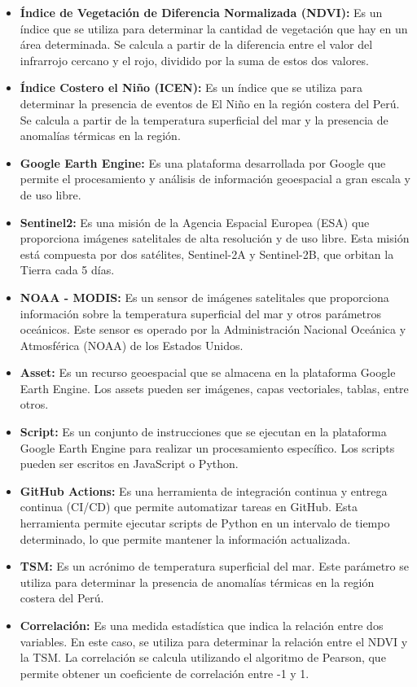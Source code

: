     \begin{itemize}
      \item \textbf{Índice de Vegetación de Diferencia Normalizada (NDVI):} Es un índice que se utiliza para determinar la cantidad de vegetación que hay en un área determinada. Se calcula a partir de la diferencia entre el valor del infrarrojo cercano y el rojo, dividido por la suma de estos dos valores.
      \item \textbf{Índice Costero el Niño (ICEN):} Es un índice que se utiliza para determinar la presencia de eventos de El Niño en la región costera del Perú. Se calcula a partir de la temperatura superficial del mar y la presencia de anomalías térmicas en la región.
      \item \textbf{Google Earth Engine:} Es una plataforma desarrollada por Google que permite el procesamiento y análisis de información geoespacial a gran escala y de uso libre.
      \item \textbf{Sentinel2:} Es una misión de la Agencia Espacial Europea (ESA) que proporciona imágenes satelitales de alta resolución y de uso libre. Esta misión está compuesta por dos satélites, Sentinel-2A y Sentinel-2B, que orbitan la Tierra cada 5 días.
      \item \textbf{NOAA - MODIS:} Es un sensor de imágenes satelitales que proporciona información sobre la temperatura superficial del mar y otros parámetros oceánicos. Este sensor es operado por la Administración Nacional Oceánica y Atmosférica (NOAA) de los Estados Unidos.
      \item \textbf{Asset:} Es un recurso geoespacial que se almacena en la plataforma Google Earth Engine. Los assets pueden ser imágenes, capas vectoriales, tablas, entre otros.
      \item \textbf{Script:} Es un conjunto de instrucciones que se ejecutan en la plataforma Google Earth Engine para realizar un procesamiento específico. Los scripts pueden ser escritos en JavaScript o Python.
      \item \textbf{GitHub Actions:} Es una herramienta de integración continua y entrega continua (CI/CD) que permite automatizar tareas en GitHub. Esta herramienta permite ejecutar scripts de Python en un intervalo de tiempo determinado, lo que permite mantener la información actualizada.
      \item \textbf{TSM:} Es un acrónimo de temperatura superficial del mar. Este parámetro se utiliza para determinar la presencia de anomalías térmicas en la región costera del Perú.
      \item \textbf{Correlación:} Es una medida estadística que indica la relación entre dos variables. En este caso, se utiliza para determinar la relación entre el NDVI y la TSM. La correlación se calcula utilizando el algoritmo de Pearson, que permite obtener un coeficiente de correlación entre -1 y 1. 
    \end{itemize}
